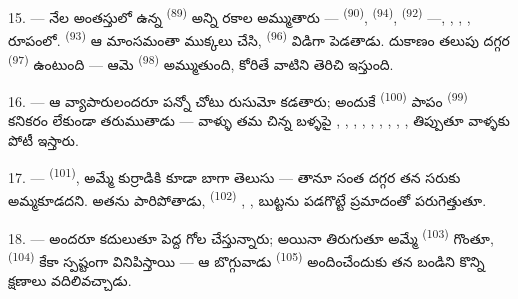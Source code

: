 \VUsaut{4.0mm}
\VUsaut{3.0mm}

15. --- నేల అంతస్తులో ఉన్న  \textsuperscript{(89)} అన్ని రకాల
 అమ్ముతారు —  \textsuperscript{(90)},
 \textsuperscript{(94)},  \textsuperscript{(92)} —,
, , ,
 రూపంలో.  \textsuperscript{(93)} ఆ మాంసమంతా
ముక్కలు చేసి,  \textsuperscript{(96)} విడిగా పెడతాడు. దుకాణం
తలుపు దగ్గర  \textsuperscript{(97)} ఉంటుంది — ఆమె
 \textsuperscript{(98)} అమ్ముతుంది, కోరితే వాటిని తెరిచి ఇస్తుంది.

16. --- ఆ వ్యాపారులందరూ పన్నో చోటు రుసుమో కడతారు; అందుకే 
\textsuperscript{(100)} పాపం 
\textsuperscript{(99)} కనికరం లేకుండా తరుముతాడు — వాళ్ళు తమ చిన్న బళ్ళపై
, , , ,
, , ,
, ,  తిప్పుతూ వాళ్ళకు పోటీ
ఇస్తారు.

\VUsaut{4.0mm}
\VUsaut{3.0mm}

17. ---  \textsuperscript{(101)},  అమ్మే కుర్రాడికి
కూడా బాగా తెలుసు — తానూ సంత దగ్గర తన సరుకు అమ్మకూడదని. అతను పారిపోతాడు,
  
\textsuperscript{(102)} , ,  బుట్టను
పడగొట్టే ప్రమాదంతో పరుగెత్తుతూ.

18. --- అందరూ కదులుతూ పెద్ద గోల చేస్తున్నారు; అయినా తిరుగుతూ అమ్మే
 \textsuperscript{(103)} గొంతూ, 
\textsuperscript{(104)} కేకా స్పష్టంగా వినిపిస్తాయి — ఆ బొగ్గువాడు
 \textsuperscript{(105)} అందించేందుకు తన బండిని కొన్ని క్షణాలు
వదిలివచ్చాడు.

\VUsaut{6.0mm}
\VUfilet{22mm}
